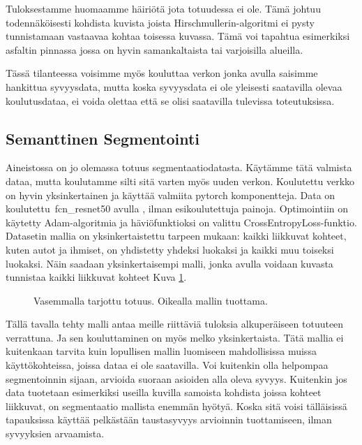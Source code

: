 Tuloksestamme huomaamme häiriötä jota totuudessa ei ole.
Tämä johtuu todennäköisesti kohdista kuvista joista Hirschmullerin-algoritmi ei pysty tunnistamaan vastaavaa kohtaa toisessa kuvassa.
Tämä voi tapahtua esimerkiksi asfaltin pinnassa jossa on hyvin samankaltaista tai varjoisilla alueilla. 

Tässä tilanteessa voisimme myös kouluttaa verkon jonka avulla saisimme hankittua syvyysdata,
mutta koska syvyysdata ei ole yleisesti saatavilla olevaa koulutusdataa,
ei voida olettaa että se olisi saatavilla tulevissa toteutuksissa. 

\subsection{Semanttinen Segmentointi}

Aineistossa on jo olemassa totuus segmentaatiodatasta.
Käytämme tätä valmista dataa, mutta koulutamme silti sitä varten myös uuden verkon.
Koulutettu verkko on hyvin yksinkertainen ja käyttää valmiita pytorch komponentteja.
Data on koulutettu\ fcn\_resnet50 avulla \cite{pytorchfcnresnet50}, ilman esikoulutettuja painoja. Optimointiin on käytetty Adam-algoritmia ja häviöfunktioksi on valittu CrossEntropyLoss-funktio.
Datasetin mallia on yksinkertaistettu tarpeen mukaan: kaikki liikkuvat kohteet, kuten autot ja ihmiset, on yhdistetty yhdeksi luokaksi ja kaikki muu toiseksi luokaksi.
Näin saadaan yksinkertaisempi malli, jonka avulla voidaan kuvasta tunnistaa kaikki liikkuvat kohteet Kuva \ref{fig:segmentation1}.

\begin{figure}[h]
\centering
{}
\caption[Tämä on lyhyt kuvateksti.]{Vasemmalla tarjottu totuus. Oikealla mallin tuottama.}
\label{fig:segmentation1}
\end{figure}
    

Tällä tavalla tehty malli antaa meille riittäviä tuloksia alkuperäiseen totuuteen verrattuna.
Ja sen kouluttaminen on myös melko yksinkertaista.
Tätä mallia ei kuitenkaan tarvita kuin lopullisen mallin luomiseen mahdollisissa muissa käyttökohteissa, joissa dataa ei ole saatavilla.
Voi kuitenkin olla helpompaa segmentoinnin sijaan, arvioida suoraan asioiden alla oleva syvyys.
Kuitenkin jos data tuotetaan esimerkiksi useilla kuvilla samoista kohdista joissa kohteet liikkuvat,
on segmentaatio mallista enemmän hyötyä.
Koska sitä voisi tälläisissä tapauksissa käyttää pelkästään taustasyvyys arvioinnin tuottamiseen, ilman syvyyksien arvaamista.

